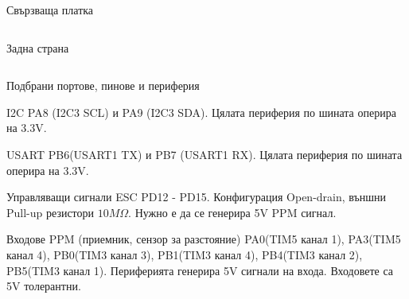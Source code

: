 \documentclass[handout]{beamer}
\begin{document}
\begin{frame}{Свързваща платка}
\begin{columns}
		Задна страна
	\end{columns}

\end{frame}


\begin{frame}{Подбрани портове, пинове и периферия}

		\begin{block}{I2C}
			PA8 (I2C3 SCL) и PA9 (I2C3 SDA). Цялата периферия по шината оперира на 3.3V.
		\end{block}

		\begin{block}{USART}
			PB6(USART1 TX) и PB7 (USART1 RX). Цялата периферия по шината оперира на 3.3V.
		\end{block}

		\begin{block}{Управляващи сигнали ESC}
			PD12 - PD15. Конфигурация Open-drain, външни Pull-up резистори \(10M\Omega\).
			Нужно е да се генерира 5V PPM сигнал.
		\end{block}

\end{frame}


\begin{frame}[t]

		\begin{block}{Входове PPM (приемник, сензор за разстояние)}
			PA0(TIM5 канал 1), PA3(TIM5 канал 4), PB0(TIM3 канал 3),
			PB1(TIM3 канал 4), PB4(TIM3 канал 2), PB5(TIM3 канал 1).
			Периферията генерира 5V сигнали на входа. Входовете са 5V толерантни.
		\end{block}

\end{frame}
\end{document}

